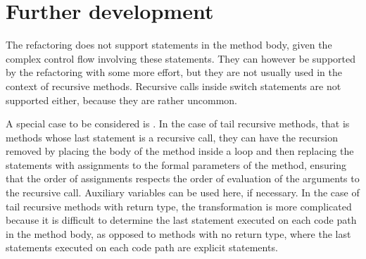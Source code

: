 \chapter{Further development}

The refactoring does not support  statements in the method body, given the complex control flow involving
these statements. They can however be supported by the refactoring with some more effort, but they are not usually used
in the context of recursive methods. Recursive calls inside switch statements are not supported either, because they are
rather uncommon.

A special case to be considered is . In the case of tail recursive methods, that is methods
whose last statement is a recursive call, they can have the recursion removed by placing the body of the method inside a
 loop and then replacing the  statements with assignments to the formal parameters of the
method, ensuring that the order of assignments respects the order of evaluation of the arguments to the recursive call.
Auxiliary variables can be used here, if necessary. In the case of tail recursive methods with  return type,
the transformation is more complicated because it is difficult to determine the last statement executed on each code
path in the method body, as opposed to methods with no  return type, where the last statements executed on
each code path are explicit  statements.